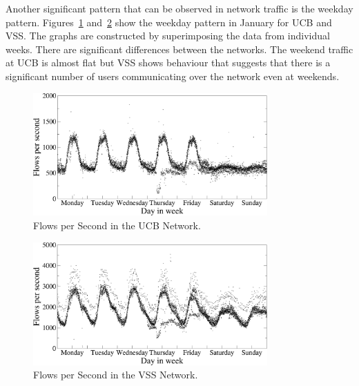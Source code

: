 Another significant pattern that can be observed in network traffic is the weekday pattern. Figures~\ref{fig:characterization-flows-week-ukb-jan} and~\ref{fig:characterization-flows-week-vss-jan} show the weekday pattern in January for UCB and VSS. The graphs are constructed by superimposing the data from individual weeks. There are significant differences between the networks. The weekend traffic at UCB is almost flat but VSS shows behaviour that suggests that there is a significant number of users communicating over the network even at weekends.
%
\begin{figure}[!t]
        \begin{center}
                \includegraphics[width=0.8\textwidth]{figures/paper-characterization/flows-week-ukb-jan}
                \caption{Flows per Second in the UCB Network.} \label{fig:characterization-flows-week-ukb-jan}
        \end{center}
\end{figure}

\begin{figure}[!htb]
        \begin{center}
                \includegraphics[width=0.8\textwidth]{figures/paper-characterization/flows-week-vss-jan}
                \caption{Flows per Second in the VSS Network.} \label{fig:characterization-flows-week-vss-jan}
        \end{center}
        \vspace{-1mm}
\end{figure}

